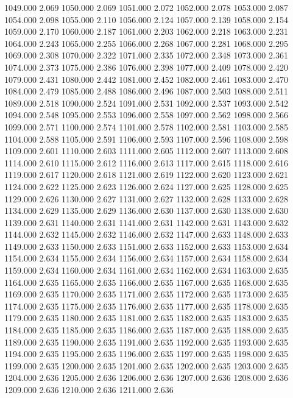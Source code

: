 1049.000 2.069 
1050.000 2.069 
1051.000 2.072 
1052.000 2.078 
1053.000 2.087 
1054.000 2.098 
1055.000 2.110 
1056.000 2.124 
1057.000 2.139 
1058.000 2.154 
1059.000 2.170 
1060.000 2.187 
1061.000 2.203 
1062.000 2.218 
1063.000 2.231 
1064.000 2.243 
1065.000 2.255 
1066.000 2.268 
1067.000 2.281 
1068.000 2.295 
1069.000 2.308 
1070.000 2.322 
1071.000 2.335 
1072.000 2.348 
1073.000 2.361 
1074.000 2.373 
1075.000 2.386 
1076.000 2.398 
1077.000 2.409 
1078.000 2.420 
1079.000 2.431 
1080.000 2.442 
1081.000 2.452 
1082.000 2.461 
1083.000 2.470 
1084.000 2.479 
1085.000 2.488 
1086.000 2.496 
1087.000 2.503 
1088.000 2.511 
1089.000 2.518 
1090.000 2.524 
1091.000 2.531 
1092.000 2.537 
1093.000 2.542 
1094.000 2.548 
1095.000 2.553 
1096.000 2.558 
1097.000 2.562 
1098.000 2.566 
1099.000 2.571 
1100.000 2.574 
1101.000 2.578 
1102.000 2.581 
1103.000 2.585 
1104.000 2.588 
1105.000 2.591 
1106.000 2.593 
1107.000 2.596 
1108.000 2.598 
1109.000 2.601 
1110.000 2.603 
1111.000 2.605 
1112.000 2.607 
1113.000 2.608 
1114.000 2.610 
1115.000 2.612 
1116.000 2.613 
1117.000 2.615 
1118.000 2.616 
1119.000 2.617 
1120.000 2.618 
1121.000 2.619 
1122.000 2.620 
1123.000 2.621 
1124.000 2.622 
1125.000 2.623 
1126.000 2.624 
1127.000 2.625 
1128.000 2.625 
1129.000 2.626 
1130.000 2.627 
1131.000 2.627 
1132.000 2.628 
1133.000 2.628 
1134.000 2.629 
1135.000 2.629 
1136.000 2.630 
1137.000 2.630 
1138.000 2.630 
1139.000 2.631 
1140.000 2.631 
1141.000 2.631 
1142.000 2.631 
1143.000 2.632 
1144.000 2.632 
1145.000 2.632 
1146.000 2.632 
1147.000 2.633 
1148.000 2.633 
1149.000 2.633 
1150.000 2.633 
1151.000 2.633 
1152.000 2.633 
1153.000 2.634 
1154.000 2.634 
1155.000 2.634 
1156.000 2.634 
1157.000 2.634 
1158.000 2.634 
1159.000 2.634 
1160.000 2.634 
1161.000 2.634 
1162.000 2.634 
1163.000 2.635 
1164.000 2.635 
1165.000 2.635 
1166.000 2.635 
1167.000 2.635 
1168.000 2.635 
1169.000 2.635 
1170.000 2.635 
1171.000 2.635 
1172.000 2.635 
1173.000 2.635 
1174.000 2.635 
1175.000 2.635 
1176.000 2.635 
1177.000 2.635 
1178.000 2.635 
1179.000 2.635 
1180.000 2.635 
1181.000 2.635 
1182.000 2.635 
1183.000 2.635 
1184.000 2.635 
1185.000 2.635 
1186.000 2.635 
1187.000 2.635 
1188.000 2.635 
1189.000 2.635 
1190.000 2.635 
1191.000 2.635 
1192.000 2.635 
1193.000 2.635 
1194.000 2.635 
1195.000 2.635 
1196.000 2.635 
1197.000 2.635 
1198.000 2.635 
1199.000 2.635 
1200.000 2.635 
1201.000 2.635 
1202.000 2.635 
1203.000 2.635 
1204.000 2.636 
1205.000 2.636 
1206.000 2.636 
1207.000 2.636 
1208.000 2.636 
1209.000 2.636 
1210.000 2.636 
1211.000 2.636 
